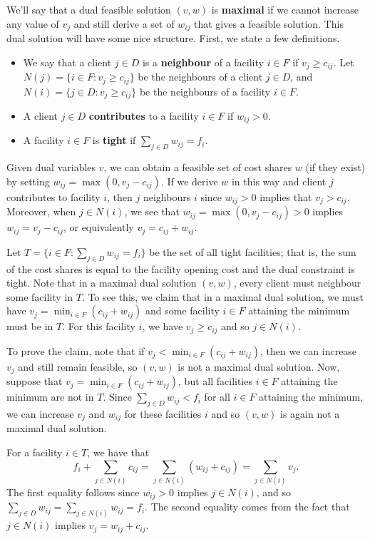 We'll say that a dual feasible solution $(v, w)$ is {\bf maximal} if we cannot 
increase any value of $v_j$ and still derive a set of $w_{ij}$ that gives a 
feasible solution. This dual solution will have some nice structure. First, we 
state a few definitions. 
\begin{itemize}
    \item We say that a client $j \in D$ is a {\bf neighbour} of a 
    facility $i \in F$ if $v_j \geq c_{ij}$. Let 
    $N(j) = \{i \in F : v_j \geq c_{ij}\}$ be the neighbours of a client 
    $j \in D$, and $N(i) = \{j \in D : v_j \geq c_{ij}\}$ be the 
    neighbours of a facility $i \in F$. 
    \item A client $j \in D$ {\bf contributes} to a facility $i \in F$
    if $w_{ij} > 0$. 
    \item A facility $i \in F$ is {\bf tight} if $\sum_{j\in D} w_{ij} = f_i$.
\end{itemize}
Given dual variables $v$, we can obtain a feasible set of cost shares 
$w$ (if they exist) by setting $w_{ij} = \max(0, v_j - c_{ij})$. If we 
derive $w$ in this way and client $j$ contributes to facility $i$, then $j$ 
neighbours $i$ since $w_{ij} > 0$ implies that $v_j > c_{ij}$. Moreover, when 
$j \in N(i)$, we see that $w_{ij} = \max(0, v_j - c_{ij}) > 0$ implies
$w_{ij} = v_j - c_{ij}$, or equivalently $v_j = c_{ij} + w_{ij}$. 

Let $T = \{i \in F : \sum_{j\in D} w_{ij} = f_i\}$ be the set of all tight 
facilities; that is, the sum of the cost shares is equal to the facility 
opening cost and the dual constraint is tight. Note that in a maximal dual 
solution $(v, w)$, every client must neighbour some facility in $T$. 
To see this, we claim that in a maximal dual solution, we must have 
$v_j = \min_{i\in F} (c_{ij} + w_{ij})$ and some facility $i \in F$ 
attaining the minimum must be in $T$. For this facility $i$, we have 
$v_j \geq c_{ij}$ and so $j \in N(i)$. 

To prove the claim, note that if $v_j < \min_{i\in F} (c_{ij} + w_{ij})$, 
then we can increase $v_j$ and still remain feasible, so $(v, w)$ is 
not a maximal dual solution. Now, suppose that $v_j = \min_{i\in F} 
(c_{ij} + w_{ij})$, but all facilities $i \in F$ attaining the 
minimum are not in $T$. Since $\sum_{j\in D} w_{ij} < f_i$ for all 
$i \in F$ attaining the minimum, we can increase $v_j$ and $w_{ij}$ 
for these facilities $i$ and so $(v, w)$ is again not a maximal dual solution.

For a facility $i \in T$, we have that 
\[ f_i + \sum_{j \in N(i)} c_{ij} = \sum_{j \in N(i)} (w_{ij} + c_{ij}) 
= \sum_{j\in N(i)} v_j. \] 
The first equality follows since $w_{ij} > 0$ implies $j \in N(i)$, 
and so $\sum_{j\in D} w_{ij} = \sum_{j \in N(i)} w_{ij} = f_i$. 
The second equality comes from the fact that $j \in N(i)$ implies 
$v_j = w_{ij} + c_{ij}$. 

